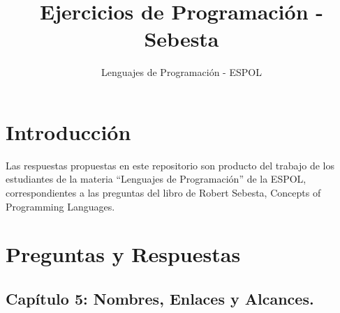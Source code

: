 \documentclass[12pt,oneside]{article}
\title{Ejercicios de Programación - Sebesta}
\author{Lenguajes de Programación - ESPOL}
\begin{document}
\maketitle

\section{Introducción}
Las respuestas propuestas en este repositorio son producto del trabajo de los estudiantes de la materia ``Lenguajes de Programación'' de la ESPOL, correspondientes a las preguntas del libro de Robert Sebesta, Concepts of Programming Languages.

\section{Preguntas y Respuestas}

\subsection{Capítulo 5: Nombres, Enlaces y Alcances.}




\end{document}
